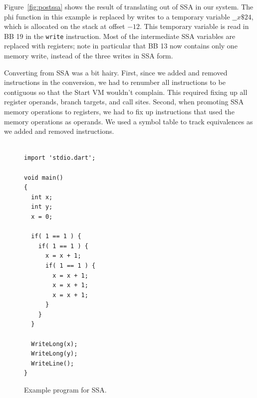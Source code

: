\documentclass[10pt,twocolumn]{article}
\begin{document}
Figure~\ref{fig:postssa} shows the result of translating out of SSA in
our system. The phi function in this example is replaced by writes to
a temporary variable $\_\_x\$24$, which is allocated on the stack at
offset $-12$. This temporary variable is read in BB 19 in the
\texttt{write} instruction. Most of the intermediate SSA variables are
replaced with registers; note in particular that BB 13 now contains
only one memory write, instead of the three writes in SSA form.

Converting from SSA was a bit hairy. First, since we added and removed
instructions in the conversion, we had to renumber all instructions to
be contiguous so that the Start VM wouldn't complain. This required
fixing up all register operands, branch targets, and call
sites. Second, when promoting SSA memory operations to registers, we
had to fix up instructions that used the memory operations as
operands. We used a symbol table to track equivalences as we added and
removed instructions.

\begin{figure}
\begin{center}
  \begin{verbatim}

import 'stdio.dart';

void main()
{
  int x;
  int y;
  x = 0;

  if( 1 == 1 ) {
    if( 1 == 1 ) {
      x = x + 1;
      if( 1 == 1 ) {
        x = x + 1;
        x = x + 1;
        x = x + 1;
      }
    }
  }

  WriteLong(x);
  WriteLong(y);
  WriteLine();
}

\end{verbatim}
\begin{minipage}{0.95\columnwidth}
  \caption{\label{fig:ssa-code} Example program for SSA.}
\end{minipage}
\end{center}
\end{figure}
\end{document}
